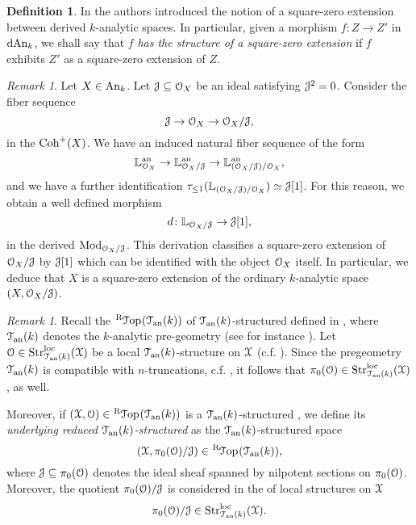 \documentclass[10pt,a4paper,reqno]{amsart} %
\theoremstyle{plain}
\theoremstyle{definition}
\newtheorem{defin}[thm]{Definition}
\theoremstyle{remark}
\newtheorem{rem}[thm]{Remark}
\numberwithin{equation}{section}
\begin{document}
\begin{defin}
    In \cite[Definition 5.41]{Porta_Yu_Representability} the authors introduced the notion of a square-zero extension between derived
    $k$-analytic spaces. In particular, given a morphism $f \colon Z \to Z'$ in $\mathrm{dAn}_k$, we shall say that $f$ \emph{has the structure of
    a square-zero extension} if $f$ exhibits $Z'$ as a square-zero extension of $Z$.
\end{defin}

\begin{rem} \label{rem:construction_of_nilpotent_extensions_as_square_zero_extensions}
    Let $X \in \mathrm{An}_k$. Let $\mathcal J \subseteq \mathcal O_X$ be an ideal satisfying $\mathcal J^2 = 0$. Consider the fiber sequence
        \[
            \mathcal J \to \mathcal O_X \to \mathcal O_X/\mathcal J,  
        \]
    in the \infcat $\mathrm{Coh}^+(X)$. We have an induced natural fiber sequence of the form
        \[
            \mathbb L_{\mathcal O_X}^\mathrm{an} \to \mathbb L_{\mathcal O_X / \mathcal J}^\mathrm{an} \to \mathbb L_{(\mathcal O_X / \mathcal J) / \mathcal O_X}^\mathrm{an},
        \]
    and we have a further identification $\tau_{\le 1} (\mathbb L_{(\mathcal O_X/ \mathcal J) / \mathcal O_X}) \simeq \mathcal J[1]$. For this reason, we obtain a well defined morphism
        \[
            d \colon \mathbb L_{\mathcal O_X/ \mathcal J} \to \mathcal J[1],
        \]
    in the derived \infcat $\mathrm{Mod}_{\mathcal O_X/ \mathcal J}$. This derivation classifies a square-zero extension of $\mathcal O_X/ \mathcal J$ by $\mathcal J[1]$ which can be identified with the
    object $\mathcal O_X$ itself. In particular, we deduce that $X$ is a square-zero extension of the ordinary $k$-analytic space $(X, \mathcal O_{X}/\mathcal J)$.
\end{rem}

\begin{rem}
    Recall the \infcat $\RTop(\cTank)$ of $\mathcal T_{\mathrm{an}}(k)$-structured \inftopoi defined in
    \cite[Definition 2.4]{Porta_Yu_Derived_non-archimedean_analytic_spaces}, where $\mathcal T_{\mathrm{an}}(k)$ denotes the $k$-analytic pre-geometry (see for instance \cite[Construction 2.2]{Porta_Yu_Derived_non-archimedean_analytic_spaces}).
    Let  $\mathcal O \in \mathrm{Str}^\mathrm{loc}_{\mathcal T_{\mathrm{an}}(k)}(\mathcal X)$ be a local $\mathcal T_{\mathrm{an}}(k)$-structure on $\mathcal X$ (c.f. \cite[Definition 2.4]{Porta_Yu_Derived_non-archimedean_analytic_spaces}). Since the pregeometry $\mathcal T_{\mathrm{an}}(k)$ is compatible
    with $n$-truncations, c.f. \cite[Theorem 3.23]{Porta_Yu_Derived_non-archimedean_analytic_spaces}, it follows that
    $\pi_0(\mathcal O) \in \mathrm{Str}^\mathrm{loc}_{\mathcal T_{\mathrm{an}}(k)}(\mathcal X)$, as well.
    
    Moreover, if $(\cX, \cO) \in \RTop(\cTank)$ is a $\mathcal T_{\mathrm{an}}(k)$-structured \inftopos, we define its \emph{underlying reduced $\mathcal T_{\mathrm{an}}(k)$-structured \inftopos} as the $\mathcal T_{\mathrm{an}}(k)$-structured space
        \[  
            (\cX, \pi_0(\cO)/ \cJ) \in \RTop(\cTank),  
        \]
    where $\mathcal J \subseteq \pi_0(\mathcal O)$ denotes the ideal sheaf spanned by nilpotent sections on $\pi_0(\mathcal O)$. Moreover, the quotient $\pi_0(\mathcal O)/ \mathcal J$
    is considered in the \infcat of local structures on $\mathcal X$
        \[
            \pi_0(\mathcal O) / \mathcal J \in \mathrm{Str}^\mathrm{loc}_{\mathcal T_{\mathrm{an}}(k)}(\mathcal X).
        \]
\end{rem}
\end{document}
